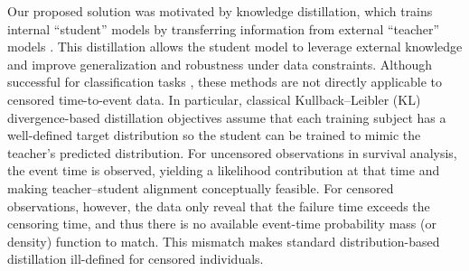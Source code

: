 \documentclass{article}
\theoremstyle{plain}
\theoremstyle{definition}
\theoremstyle{remark}
\begin{document}


Our proposed solution was motivated by knowledge distillation, which trains internal “student” models by transferring information from external “teacher” models \citep{hinton2015distilling, gou2021knowledge}. This distillation allows the student model to leverage external knowledge and improve generalization and robustness under data constraints. Although successful for classification tasks \citep{ma2021distilling, ranjbari2023integration}, these methods are not directly applicable to censored time-to-event data. In particular, classical Kullback–Leibler (KL) divergence-based distillation objectives assume that each training subject has a well-defined target distribution so the student can be trained to mimic the teacher's predicted distribution. 
For uncensored observations in survival analysis, the event time is observed, yielding a likelihood contribution at that time and making teacher–student alignment conceptually feasible. For censored observations, however, the data only reveal that the failure time exceeds the censoring time, and thus there is no available event-time probability mass (or density) function to match. This mismatch makes standard distribution-based distillation ill-defined for censored individuals. %
\end{document}
